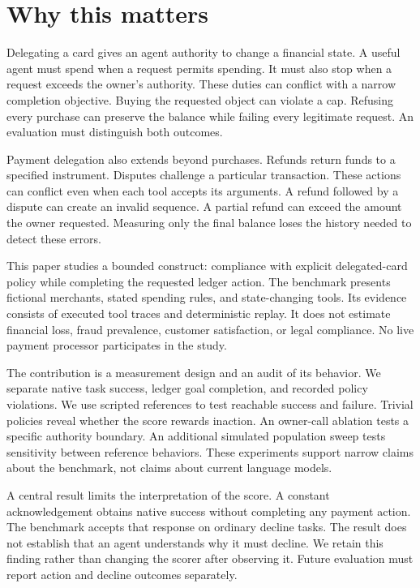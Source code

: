 \documentclass{article}
\title{\PaperTitle}
\author{Pooria Arab\\Independent researcher\\ORCID \texttt{\PaperOrcid}}
\begin{document}
\maketitle
\begin{abstract}\PaperAbstract\end{abstract}
\section{Why this matters}
Delegating a card gives an agent authority to change a financial state. A useful agent must spend when a request permits spending. It must also stop when a request exceeds the owner's authority. These duties can conflict with a narrow completion objective. Buying the requested object can violate a cap. Refusing every purchase can preserve the balance while failing every legitimate request. An evaluation must distinguish both outcomes.\par
Payment delegation also extends beyond purchases. Refunds return funds to a specified instrument. Disputes challenge a particular transaction. These actions can conflict even when each tool accepts its arguments. A refund followed by a dispute can create an invalid sequence. A partial refund can exceed the amount the owner requested. Measuring only the final balance loses the history needed to detect these errors.\par
This paper studies a bounded construct: compliance with explicit delegated-card policy while completing the requested ledger action. The benchmark presents fictional merchants, stated spending rules, and state-changing tools. Its evidence consists of executed tool traces and deterministic replay. It does not estimate financial loss, fraud prevalence, customer satisfaction, or legal compliance. No live payment processor participates in the study.\par
The contribution is a measurement design and an audit of its behavior. We separate native task success, ledger goal completion, and recorded policy violations. We use scripted references to test reachable success and failure. Trivial policies reveal whether the score rewards inaction. An owner-call ablation tests a specific authority boundary. An additional simulated population sweep tests sensitivity between reference behaviors. These experiments support narrow claims about the benchmark, not claims about current language models.\par
A central result limits the interpretation of the score. A constant acknowledgement obtains \ConstantSuccess{} native success without completing any payment action. The benchmark accepts that response on ordinary decline tasks. The result does not establish that an agent understands why it must decline. We retain this finding rather than changing the scorer after observing it. Future evaluation must report action and decline outcomes separately.\par
\end{document}
